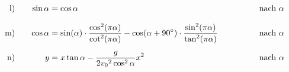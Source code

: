 \begin{exercise}
\begin{alignat*}{4}
      \exnum{l)}&\quad &    \sin\alpha&=\cos\alpha                                                                  & \quad&\quad & \quad&\text{nach $\alpha$}     \\
      \exnum{m)}&\quad &    \cos\alpha&=\sin(\alpha)\cdot\frac{\cos^{2}(\pi\alpha)}{\cot^{2}(\pi\alpha)}
                                       -\cos(\alpha+90^{\circ})\cdot\frac{\sin^{2}(\pi\alpha)}{\tan^{2}(\pi\alpha)} & \quad&\quad & \quad&\text{nach $\alpha$}     \\
      \exnum{n)}&\quad &              y&=x\tan\alpha-\frac{g}{2{v_{0}}^{2}\cos^{2}\alpha}x^{2}                      & \quad&\quad & \quad&\text{nach $\alpha$}
    \end{alignat*}
  \fi
\end{exercise}
